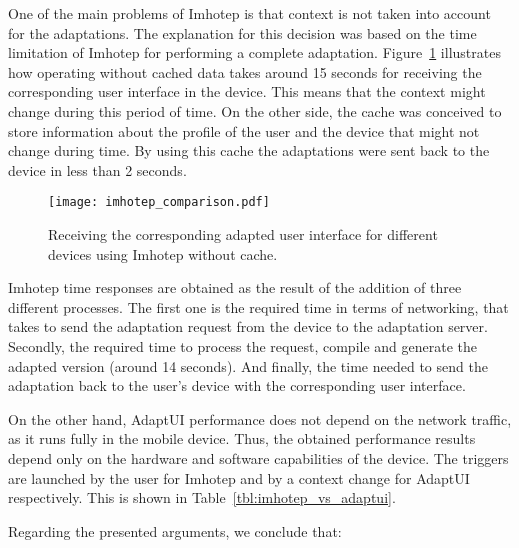 One of the main problems of Imhotep is that context is not taken into account 
for the adaptations. The explanation for this decision was based on the time 
limitation of Imhotep for performing a complete adaptation. 
Figure~\ref{fig:imhotep_comparison} illustrates how operating without cached 
data takes around 15 seconds for receiving the corresponding user interface in 
the device. This means that the context might change during this period of time. 
On the other side, the cache was conceived to store information about the 
profile of the user and the device that might not change during time. By using 
this cache the adaptations were sent back to the device in less than 2 seconds.

\begin{figure}
\centering
\texttt{[image: imhotep\_comparison.pdf]}
\caption{Receiving the corresponding adapted user interface for different
devices using Imhotep without cache.}
\label{fig:imhotep_comparison}
\end{figure}


Imhotep time responses are obtained as the result of the addition of three
different processes. The first one is the required time in terms of networking,
that takes to send the adaptation request from the device to the adaptation 
server. Secondly, the required time to process the request, compile and generate 
the adapted version (around 14 seconds). And finally, the time needed to send 
the adaptation back to the user's device with the corresponding user interface. 

On the other hand, AdaptUI performance does not depend on the network traffic, 
as it runs fully in the mobile device. Thus, the obtained performance results 
depend only on the hardware and software capabilities of the device. The 
triggers are launched by the user for Imhotep and by a context change for 
AdaptUI respectively. This is shown in Table~\ref{tbl:imhotep_vs_adaptui}.

Regarding the presented arguments, we conclude that:

